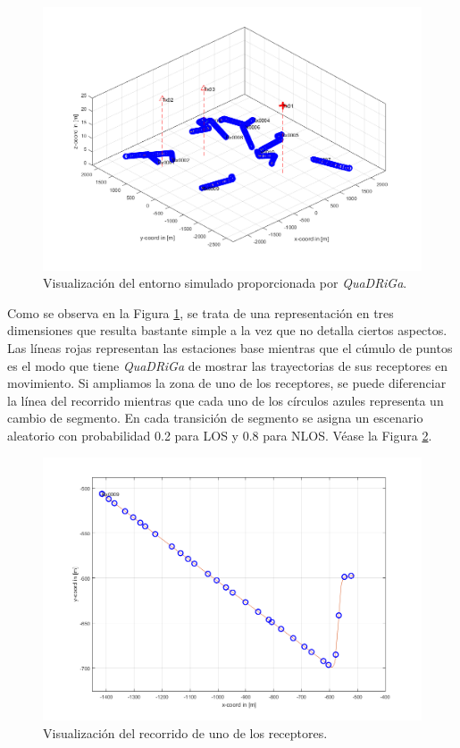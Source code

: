 \begin{figure}[h!]
	\centering
    \includegraphics[width=\linewidth]{imagenes/visualizacion_ejemplo.png}
	\caption{Visualización del entorno simulado proporcionada por \textit{QuaDRiGa}.}
	\label{fig:repres_ejemplo}
\end{figure}

Como se observa en la Figura \ref{fig:repres_ejemplo}, se trata de una representación en tres dimensiones que resulta bastante simple a la vez que no detalla ciertos aspectos. Las líneas rojas representan las estaciones base mientras que el cúmulo de puntos es el modo que tiene \textit{QuaDRiGa} de mostrar las trayectorias de sus receptores en movimiento. Si ampliamos la zona de uno de los receptores, se puede diferenciar la línea del recorrido mientras que cada uno de los círculos azules representa un cambio de segmento. En cada transición de segmento se asigna un escenario aleatorio con probabilidad 0.2 para LOS y 0.8 para NLOS. Véase la Figura \ref{fig:receptor_ejemplo}.

\begin{figure}[h!]
	\centering
    \includegraphics[width=\linewidth]{imagenes/visualizacion_ejemplo_rx1.png}
	\caption{Visualización del recorrido de uno de los receptores.}
	\label{fig:receptor_ejemplo}
\end{figure}

